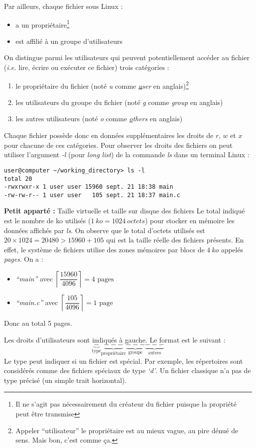 \documentclass[../../../main.tex]{subfiles}
\begin{document}
Par ailleurs, chaque fichier sous Linux :
\begin{itemize}
	\item a un propriétaire\footnote{Il ne s'agit pas nécessairement du créateur du fichier puisque la propriété peut être transmise}
	\item est affilié à un groupe d'utilisateurs
\end{itemize}
On distingue parmi les utilisateurs qui peuvent potentiellement accéder au fichier (\textit{i.e.} lire, écrire ou exécuter ce fichier) trois catégories :
\begin{enumerate}
	\item le propriétaire du fichier (noté \textit{u} comme \textit{\underline{u}ser} en anglais)\footnote{Appeler ``utilisateur'' le propriétaire est au mieux vague, au pire dénué de sens. Mais bon, c'est comme ça.}
	\item les utilisateurs du groupe du fichier (noté \textit{g} comme \textit{\underline{g}roup} en anglais)
	\item les autres utilisateurs (noté \textit{o} comme \textit{\underline{o}thers} en anglais)
\end{enumerate}
Chaque fichier possède donc en données supplémentaires les droits de $r$, $w$ et $x$ pour chacune de ces catégories. \newline
Pour observer les droits des fichiers on peut utiliser l'argument \textit{-l} (pour \textit{long list}) de la commande \textit{ls} dans un terminal Linux :
\begin{verbatim}
user@computer ~/working_directory> ls -l
total 20
-rwxrwxr-x 1 user user 15960 sept. 21 18:38 main
-rw-rw-r-- 1 user user   105 sept. 21 18:37 main.c
\end{verbatim}
\begin{minitelbasicbox}{\textbf{Petit apparté :} Taille virtuelle et taille sur disque des fichiers}
Le total indiqué est le nombre de ko utilisés ($1\ ko = 1024\ octets$) pour stocker en mémoire les données affichés par \textit{ls}. On observe que le total d'octets utilisés est $20\times{1024} = 20480>15960 + 105$ qui est la taille réelle des fichiers présents. En effet, le système de fichiers utilise des zones mémoires par blocs de $4\ ko$ appelés \textit{pages}. On a :
\begin{itemize}
	\item \textit{``main''} avec $\left\lceil\dfrac{15960}{4096}\right\rceil = 4 \text{ pages}$
	\item \textit{``main.c''} avec $\left\lceil\dfrac{105}{4096}\right\rceil = 1\text{\ page}$
\end{itemize}
Donc au total 5 pages.
\end{minitelbasicbox}
Les droits d'utilisateurs sont indiqués à gauche. Le format est le suivant :
$$\underbrace{-}_{\text{type}}\underbrace{---}_{\text{propriétaire}}\underbrace{---}_{\text{groupe}}\underbrace{---}_{\text{autres}}$$
Le type peut indiquer si un fichier est spécial. Par exemple, les répertoires sont considérés comme des fichiers spéciaux de type \textit{`d'}. Un fichier classique n'a pas de type précisé (un simple trait horizontal).
 
\end{document}

